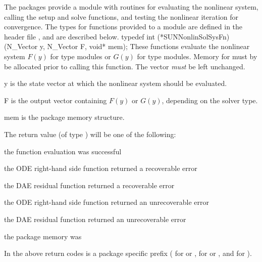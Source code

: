 The {\sundials} packages provide a {\sunnonlinsol} module with
routines for evaluating the nonlinear system, calling the {\sunlinsol}
setup and solve functions, and testing the nonlinear iteration for
convergence. The types for functions provided to a {\sunnonlinsol}
module are defined in the header file
, and are described below. 
{
  typedef int (*SUNNonlinSolSysFn)(N\_Vector y, N\_Vector F, void* mem);
}
{
  These functions evaluate the nonlinear system $F(y)$
  for  type modules or $G(y)$
  for  type modules. Memory
  for  must by be allocated prior to calling this function. The
  vector  \textit{must} be left unchanged.
}
{
  \begin{args}[mem]
  \item[y]
    is the state vector at which the nonlinear system should be evaluated.
  \item[F]
    is the output vector containing $F(y)$ or $G(y)$, depending on the
    solver type.
  \item[mem]
    is the {\sundials} package memory structure.
  \end{args}
}
{
  The return value  (of type ) will be one of the
  following:
  \begin{args}
  \item[\id{*\_SUCCESS}]
    the function evaluation was successful
  \item[\id{*\_RHSFUNC\_RECVR}]
    the ODE right-hand side function returned a recoverable error
  \item[\id{*\_RES\_RECVR}]
    the DAE residual function returned a recoverable error
  \item[\id{*\_RHSFUNC\_FAIL}]
    the ODE right-hand side function returned an unrecoverable error
  \item[\id{*\_RES\_FAIL}]
    the DAE residual function returned an unrecoverable error
  \item[\id{*\_MEM\_NULL}]
    the {\sundials} package memory was 
  \end{args}
  In the above return codes \id{*} is a {\sundials} package specific
  prefix ( for {\cvode} or {\cvodes},  for {\ida} or
  {\idas}, and  for {\arkode}).
}
{}

